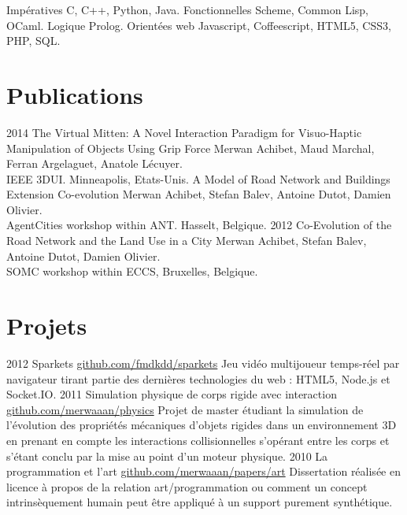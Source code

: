 \documentclass[]{friggeri-cv}
\begin{document}
\begin{entrylist}
  \entry
    {}
    {Impératives}
    {}
    {C, C++, Python, Java.}
  \entry
    {}
    {Fonctionnelles}
    {}
    {Scheme, Common Lisp, OCaml.}
  \entry
    {}
    {Logique}
    {}
    {Prolog.}
  \entry
    {}
    {Orientées web}
    {}
    {Javascript, Coffeescript, HTML5, CSS3, PHP, SQL.}
\end{entrylist}

\section{Publications}

\begin{entrylist}
  \entry
    {2014}
    {The Virtual Mitten: A Novel Interaction Paradigm for Visuo-Haptic\\ Manipulation of Objects Using Grip Force}
    {}
    {Merwan Achibet, Maud Marchal, Ferran Argelaguet, Anatole Lécuyer.\\ IEEE 3DUI. Minneapolis, Etats-Unis.}
  \entry
    {}
    {A Model of Road Network and Buildings Extension Co-evolution}
    {}
    {Merwan Achibet, Stefan Balev, Antoine Dutot, Damien Olivier.\\ AgentCities workshop within ANT. Hasselt, Belgique.}
  \entry
    {2012}
    {Co-Evolution of the Road Network and the Land Use in a City}
    {}
    {Merwan Achibet, Stefan Balev, Antoine Dutot, Damien Olivier.\\ SOMC workshop within ECCS, Bruxelles, Belgique.}

\end{entrylist}

\section{Projets}

\begin{entrylist}
  \entry
    {2012}
    {Sparkets}
    {\href{http://github.com/fmdkdd/sparkets}{github.com/fmdkdd/sparkets}}
    {Jeu vidéo multijoueur temps-réel par navigateur tirant partie des
      dernières technologies du web : HTML5, Node.js et Socket.IO.}
  \entry
    {2011}
    {Simulation physique de corps rigide avec interaction}
    {\href{http://github.com/merwaaan/physics}{github.com/merwaaan/physics}}
    {Projet de master étudiant la simulation de l'évolution des
      propriétés mécaniques d'objets rigides dans un environnement 3D
      en prenant en compte les interactions collisionnelles s'opérant
      entre les corps et s'étant conclu par la mise au point d'un
      moteur physique.}
  \entry
    {2010}
    {La programmation et l'art}
    {\href{http://github.com/merwaaan/papers/blob/master/art/progart.pdf?raw=true}{github.com/merwaaan/papers/art}}
    {Dissertation réalisée en licence à propos de la relation
      art/programmation ou comment un concept intrinsèquement humain
      peut être appliqué à un support purement synthétique.}

\end{entrylist}
\end{document}
